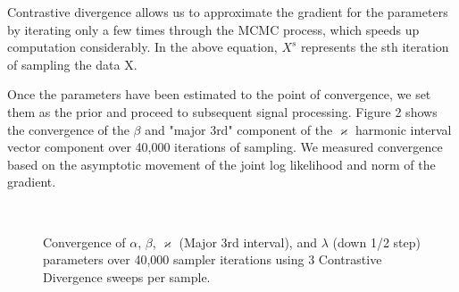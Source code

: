 \documentclass{article}
\begin{document}
Contrastive divergence allows us to approximate the gradient for the parameters by iterating only a few times through the MCMC process, which speeds up computation considerably.  In the above equation, $X^s$ represents the sth iteration of sampling the data X.

Once the parameters have been estimated to the point of convergence, we set them as the prior and proceed to subsequent signal processing.  Figure 2 shows the convergence of the $\beta$ and "major 3rd" component of the $\varkappa$ harmonic interval vector component over 40,000 iterations of sampling.  We measured convergence based on the asymptotic movement of the joint log likelihood and norm of the gradient.

\begin{figure}
\centering
\mbox{
\quad
{}\quad
{}\quad
{}
}
\centering
\caption{Convergence of $\alpha$, $\beta$, $\varkappa$ (Major 3rd interval), and $\lambda$ (down 1/2 step) parameters over 40,000 sampler iterations using 3 Contrastive Divergence sweeps per sample.}
\label{fig-all}
\end{figure}
\end{document}
